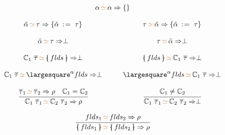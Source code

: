 \documentclass[11pt,a4paper]{article}
\newcommand{\record}[1]{\{\!\!\shortmid #1 \shortmid\!\!\}}
\newcommand{\irecrd}[2]{\largesquare^{#1}{#2}}
\newcommand{\tyvarsubst}[2]{#1\ \hspace{-0.2ex}:\hspace{1pt}=\ #2}
\newcommand{\rigdvar}[1]{\ddot{#1}}
\newcommand{\flexvar}[1]{\tilde#1}
\newcommand{\unify}[3]{#1\,{\color{brown}{\simeq}}\,#2 \Rightarrow #3}
\newcommand{\braced}[1]{\{#1\}}
\newcommand{\tycon}{\mathbb{C}}
\newcommand{\type}{\tau}
\begin{document}
\[
\begin{array}{ccc}
 \multicolumn{3}{c}{\unify{\alpha}{\alpha}{\braced{}}} \\
 &                                                                                                          \\
 {\unify{\flexvar{\alpha}}{\type}{\{\tyvarsubst{\flexvar\alpha}{\type}\}}} & \quad & 
 {\unify{\type}{\flexvar{\alpha}}{\{\tyvarsubst{\flexvar\alpha}{\type}\}}}                                  \\
 &                                                                                                          \\
 {\unify{\rigdvar{\alpha}}{\type}{\perp}} & \quad & 
 {\unify{\type}{\rigdvar{\alpha}}{\perp}}                                                                   \\
 &                                                                                                          \\
 \unify{\tycon_1\ \ts}{\record{flds}}{\perp}     & \quad & \unify{\record{flds}}{\tycon_1\ \ts}{\perp}      \\      
 &                                                                                                          \\
 \unify{\tycon_1\ \ts}{\irecrd{\alpha}{flds}}{\perp} & \quad & \unify{\irecrd{\alpha}{flds}}{\tycon_1\ \ts}{\perp}  \\      
 &                                                                                                          \\
 \cfrac
  {\unify{\ts_1}{\ts_2}{\rho} \quad \tycon_1 = \tycon_2}
  {\unify{\tycon_1\ \ts_1}{\tycon_2\ \ts_2}{\rho}} & \quad &
 \cfrac
  {\tycon_1 \ne \tycon_2}
  {\unify{\tycon_1\ \ts_1}{\tycon_2\ \ts_2}{\perp}}                                                         \\
 &                                                                                                          \\
 \multicolumn{3}{c}{ \cfrac
  {\unify{flds_1}{flds_2}{\rho}}
  {\unify{\record{flds_1}}{\record{flds_2}}{\rho}} }                                                        \\
\end{array}
\]
\end{document}
